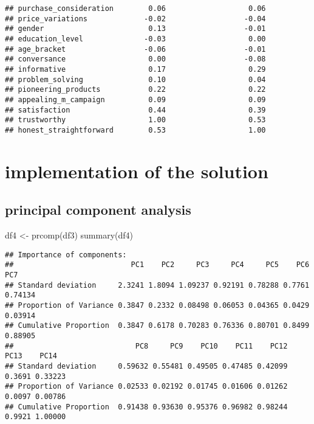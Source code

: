 \documentclass[
]{article}
\newenvironment{Shaded}{\begin{snugshade}}{\end{snugshade}}
\newcommand{\FunctionTok}[1]{\textcolor[rgb]{0.00,0.00,0.00}{#1}}
\newcommand{\NormalTok}[1]{#1}
\newcommand{\OtherTok}[1]{\textcolor[rgb]{0.56,0.35,0.01}{#1}}
\begin{document}
\begin{verbatim}
## purchase_consideration        0.06                   0.06
## price_variations             -0.02                  -0.04
## gender                        0.13                  -0.01
## education_level              -0.03                   0.00
## age_bracket                  -0.06                  -0.01
## conversance                   0.00                  -0.08
## informative                   0.17                   0.29
## problem_solving               0.10                   0.04
## pioneering_products           0.22                   0.22
## appealing_m_campaign          0.09                   0.09
## satisfaction                  0.44                   0.39
## trustworthy                   1.00                   0.53
## honest_straightforward        0.53                   1.00
\end{verbatim}

\hypertarget{implementation-of-the-solution}{%
\section{implementation of the
solution}\label{implementation-of-the-solution}}

\hypertarget{principal-component-analysis}{%
\subsection{principal component
analysis}\label{principal-component-analysis}}

\begin{Shaded}
\begin{Highlighting}[]
\NormalTok{df4 }\OtherTok{\textless{}{-}} \FunctionTok{prcomp}\NormalTok{(df3)}
\FunctionTok{summary}\NormalTok{(df4)}
\end{Highlighting}
\end{Shaded}

\begin{verbatim}
## Importance of components:
##                           PC1    PC2     PC3     PC4     PC5    PC6     PC7
## Standard deviation     2.3241 1.8094 1.09237 0.92191 0.78288 0.7761 0.74134
## Proportion of Variance 0.3847 0.2332 0.08498 0.06053 0.04365 0.0429 0.03914
## Cumulative Proportion  0.3847 0.6178 0.70283 0.76336 0.80701 0.8499 0.88905
##                            PC8     PC9    PC10    PC11    PC12   PC13    PC14
## Standard deviation     0.59632 0.55481 0.49505 0.47485 0.42099 0.3691 0.33223
## Proportion of Variance 0.02533 0.02192 0.01745 0.01606 0.01262 0.0097 0.00786
## Cumulative Proportion  0.91438 0.93630 0.95376 0.96982 0.98244 0.9921 1.00000
\end{verbatim}
\end{document}
